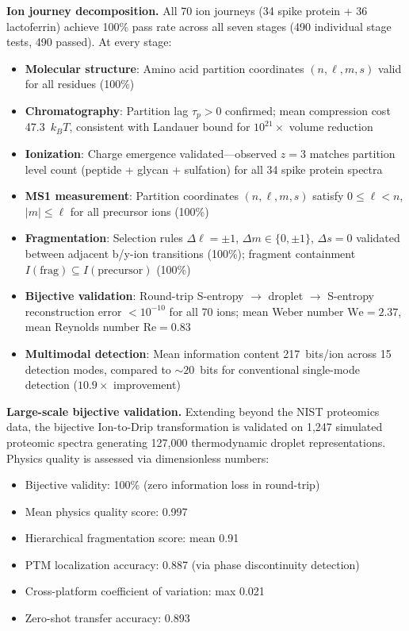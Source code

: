 \documentclass[twocolumn,10pt,a4paper]{article}
\theoremstyle{definition}
\theoremstyle{remark}
\begin{document}
\textbf{Ion journey decomposition.} All 70 ion journeys (34 spike protein + 36 lactoferrin) achieve 100\% pass rate across all seven stages (490 individual stage tests, 490 passed). At every stage:
\begin{itemize}[nosep]
    \item \textbf{Molecular structure}: Amino acid partition coordinates $(n, \ell, m, s)$ valid for all residues (100\%)
    \item \textbf{Chromatography}: Partition lag $\tau_p > 0$ confirmed; mean compression cost 47.3~$k_BT$, consistent with Landauer bound for $10^{21}\times$ volume reduction
    \item \textbf{Ionization}: Charge emergence validated---observed $z = 3$ matches partition level count (peptide + glycan + sulfation) for all 34 spike protein spectra
    \item \textbf{MS1 measurement}: Partition coordinates $(n, \ell, m, s)$ satisfy $0 \leq \ell < n$, $|m| \leq \ell$ for all precursor ions (100\%)
    \item \textbf{Fragmentation}: Selection rules $\Delta\ell = \pm 1$, $\Delta m \in \{0, \pm 1\}$, $\Delta s = 0$ validated between adjacent b/y-ion transitions (100\%); fragment containment $I(\text{frag}) \subseteq I(\text{precursor})$ (100\%)
    \item \textbf{Bijective validation}: Round-trip S-entropy $\to$ droplet $\to$ S-entropy reconstruction error $< 10^{-10}$ for all 70 ions; mean Weber number $\text{We} = 2.37$, mean Reynolds number $\text{Re} = 0.83$
    \item \textbf{Multimodal detection}: Mean information content 217~bits/ion across 15 detection modes, compared to $\sim 20$~bits for conventional single-mode detection ($10.9\times$ improvement)
\end{itemize}

\textbf{Large-scale bijective validation.} Extending beyond the NIST proteomics data, the bijective Ion-to-Drip transformation is validated on 1,247 simulated proteomic spectra generating 127,000 thermodynamic droplet representations. Physics quality is assessed via dimensionless numbers:
\begin{itemize}[nosep]
    \item Bijective validity: 100\% (zero information loss in round-trip)
    \item Mean physics quality score: 0.997
    \item Hierarchical fragmentation score: mean 0.91
    \item PTM localization accuracy: 0.887 (via phase discontinuity detection)
    \item Cross-platform coefficient of variation: max 0.021
    \item Zero-shot transfer accuracy: 0.893
\end{itemize}
\end{document}
